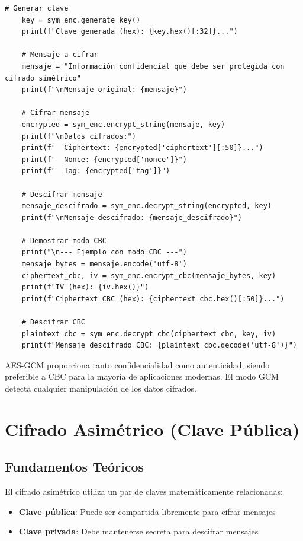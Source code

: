 \documentclass[12pt,a4paper]{article}
\begin{document}
\begin{lstlisting}[caption=Implementación de cifrado simétrico con AES]
    # Generar clave
    key = sym_enc.generate_key()
    print(f"Clave generada (hex): {key.hex()[:32]}...")
    
    # Mensaje a cifrar
    mensaje = "Información confidencial que debe ser protegida con cifrado simétrico"
    print(f"\nMensaje original: {mensaje}")
    
    # Cifrar mensaje
    encrypted = sym_enc.encrypt_string(mensaje, key)
    print(f"\nDatos cifrados:")
    print(f"  Ciphertext: {encrypted['ciphertext'][:50]}...")
    print(f"  Nonce: {encrypted['nonce']}")
    print(f"  Tag: {encrypted['tag']}")
    
    # Descifrar mensaje
    mensaje_descifrado = sym_enc.decrypt_string(encrypted, key)
    print(f"\nMensaje descifrado: {mensaje_descifrado}")
    
    # Demostrar modo CBC
    print("\n--- Ejemplo con modo CBC ---")
    mensaje_bytes = mensaje.encode('utf-8')
    ciphertext_cbc, iv = sym_enc.encrypt_cbc(mensaje_bytes, key)
    print(f"IV (hex): {iv.hex()}")
    print(f"Ciphertext CBC (hex): {ciphertext_cbc.hex()[:50]}...")
    
    # Descifrar CBC
    plaintext_cbc = sym_enc.decrypt_cbc(ciphertext_cbc, key, iv)
    print(f"Mensaje descifrado CBC: {plaintext_cbc.decode('utf-8')}")
\end{lstlisting}

\begin{cryptoanalysis}
	AES-GCM proporciona tanto confidencialidad como autenticidad, siendo preferible a CBC para la mayoría de aplicaciones modernas. El modo GCM detecta cualquier manipulación de los datos cifrados.
\end{cryptoanalysis}

\newpage

\section{Cifrado Asimétrico (Clave Pública)}

\subsection{Fundamentos Teóricos}

El cifrado asimétrico utiliza un par de claves matemáticamente relacionadas:

\begin{itemize}
	\item \textbf{Clave pública}: Puede ser compartida libremente para cifrar mensajes
	\item \textbf{Clave privada}: Debe mantenerse secreta para descifrar mensajes
\end{itemize}
\end{document}
